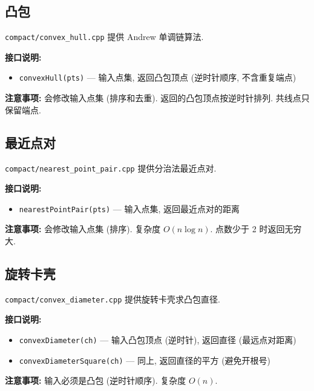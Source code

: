 \documentclass[a4paper]{ctexbook}
\begin{document}
\subsection{凸包}

\texttt{compact/convex\_hull.cpp} 提供 Andrew 单调链算法.

\textbf{接口说明:}
\begin{itemize}
	\item \texttt{convexHull(pts)} — 输入点集, 返回凸包顶点 (逆时针顺序, 不含重复端点)
\end{itemize}

\textbf{注意事项:} 会修改输入点集 (排序和去重). 返回的凸包顶点按逆时针排列. 共线点只保留端点.



\subsection{最近点对}

\texttt{compact/nearest\_point\_pair.cpp} 提供分治法最近点对.

\textbf{接口说明:}
\begin{itemize}
	\item \texttt{nearestPointPair(pts)} — 输入点集, 返回最近点对的距离
\end{itemize}

\textbf{注意事项:} 会修改输入点集 (排序). 复杂度 $O(n \log n)$. 点数少于 2 时返回无穷大.



\subsection{旋转卡壳}

\texttt{compact/convex\_diameter.cpp} 提供旋转卡壳求凸包直径.

\textbf{接口说明:}
\begin{itemize}
	\item \texttt{convexDiameter(ch)} — 输入凸包顶点 (逆时针), 返回直径 (最远点对距离)
	\item \texttt{convexDiameterSquare(ch)} — 同上, 返回直径的平方 (避免开根号)
\end{itemize}

\textbf{注意事项:} 输入必须是凸包 (逆时针顺序). 复杂度 $O(n)$.


\end{document}

